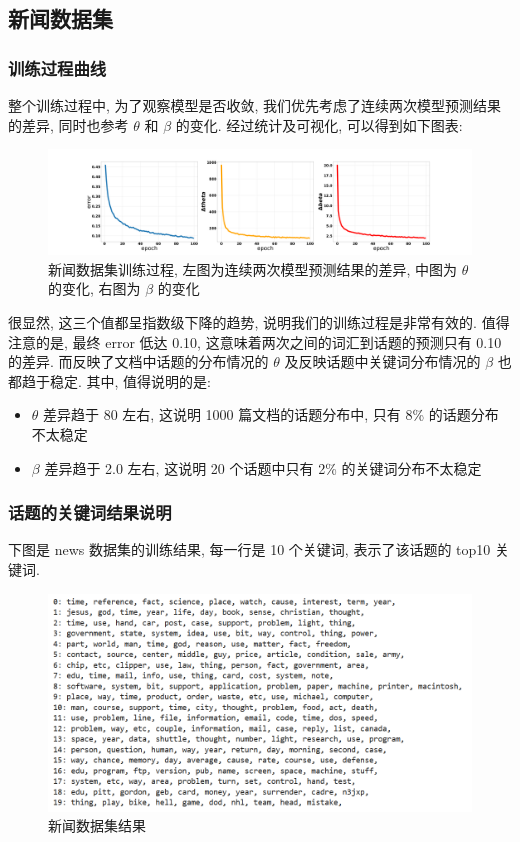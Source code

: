 \documentclass[UTF8]{article}
\begin{document}
\subsection{新闻数据集}
\subsubsection{训练过程曲线}
整个训练过程中, 为了观察模型是否收敛, 我们优先考虑了连续两次模型预测结果的差异, 同时也参考 $\theta$ 和 $\beta$ 的变化. 经过统计及可视化, 可以得到如下图表:
\\\noindent
\begin{center}
\begin{figure}[H]
	\centering
	\includegraphics[width=\linewidth]{image/newstraining.png}
	\caption{新闻数据集训练过程, 左图为连续两次模型预测结果的差异, 中图为 $\theta$ 的变化, 右图为 $\beta$ 的变化}
\end{figure}
\end{center}

很显然, 这三个值都呈指数级下降的趋势, 说明我们的训练过程是非常有效的. 值得注意的是, 最终 error 低达 0.10, 这意味着两次之间的词汇到话题的预测只有 0.10 的差异. 而反映了文档中话题的分布情况的 $\theta$ 及反映话题中关键词分布情况的 $\beta$ 也都趋于稳定. 其中, 值得说明的是:
\begin{itemize}
\item $\theta$ 差异趋于 80 左右, 这说明 1000 篇文档的话题分布中, 只有 8\% 的话题分布不太稳定
\item $\beta$ 差异趋于 2.0 左右, 这说明 20 个话题中只有 2\% 的关键词分布不太稳定
\end{itemize}
\subsubsection{话题的关键词结果说明}
下图是 news 数据集的训练结果, 每一行是 10 个关键词, 表示了该话题的 top10 关键词.
\begin{center}
\begin{figure}[H]
	\centering
	\includegraphics[width=\linewidth*7/9]{image/newsresult.png}
	\caption{新闻数据集结果}
\end{figure}
\end{center}
\end{document}
